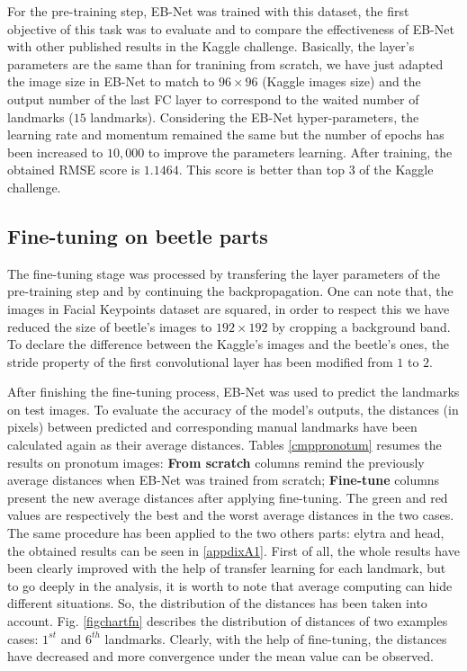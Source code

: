 \documentclass[review]{elsarticle}
\begin{document}
For the pre-training step, EB-Net was trained with this dataset,
the first objective of this task was to evaluate and to compare the
effectiveness of EB-Net with other published results in the
Kaggle challenge. Basically, the layer's parameters are the same than for
tranining from scratch, we have just adapted the image size in EB-Net
to match to $96 \times 96$ (Kaggle images size) and the output number of the last FC layer to
correspond to the waited number of landmarks ($15$
landmarks). Considering the EB-Net hyper-parameters, the learning rate and momentum remained the
same but the number of epochs has been increased to $10,000$ to improve the parameters learning. After training, the
obtained RMSE score is $1.1464$. This score is better than top $3$ of
the Kaggle challenge.

\subsection{Fine-tuning on beetle parts}
The fine-tuning stage was processed by transfering the layer parameters of
the pre-training step and by continuing the backpropagation. One can note that, the images in Facial Keypoints
dataset are squared, in order to respect this we have reduced the size
of beetle's images to $192 \times 192$ by cropping a background
band. To declare the difference between the Kaggle's images and the
beetle's ones, the stride property of the first convolutional
layer has been modified from $1$ to $2$.


After finishing the fine-tuning process, EB-Net was used to predict the
landmarks on test images. To evaluate the accuracy of the model's
outputs, the distances (in pixels) between predicted and corresponding
manual landmarks have been calculated again as their average
distances. Tables \ref{cmppronotum} resumes the results on pronotum
images: \textbf{From scratch} columns remind the previously average
distances when EB-Net was trained from scratch; \textbf{Fine-tune}
columns present the new average distances after applying
fine-tuning. The green and red values are respectively the best and
the worst average distances in the two cases. The same procedure has
been applied to the two others parts: elytra and head, the obtained results can be
seen in \ref{appdixA1}. First of all, the whole results have been clearly
improved with the help of transfer learning for each landmark, but to
go deeply in the analysis, it is worth to note that average computing can hide different
situations. So, the distribution of the distances has been taken into
account. Fig. \ref{figchartfn} describes the distribution of distances
of two examples cases: $1^{st}$ and $6^{th}$ landmarks. Clearly, with
the help of fine-tuning, the distances have decreased and more
convergence under the mean value can be observed.
\end{document}
